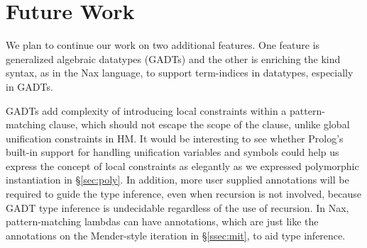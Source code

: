 \documentclass[runningheads,a4paper]{llncs}
\begin{document}
\section{Future Work}\label{sec:futwork}
We plan to continue our work on two additional features.
One feature is generalized algebraic datatypes (GADTs)
and the other is enriching the kind syntax, as in the
Nax language, to support term-indices in datatypes,
especially in GADTs.

GADTs add complexity of introducing local constraints
within a pattern-matching clause, which should not escape
the scope of the clause, unlike global unification constraints in HM.
It would be interesting to see whether Prolog's built-in support for
handling unification variables and symbols could help us express
the concept of local constraints as elegantly as we expressed
polymorphic instantiation in \S\ref{sec:poly}. In addition,
more user supplied annotations will be required to guide the type inference,
even when recursion is not involved, because GADT type inference is
undecidable \cite{DegtyarevV95} regardless of the use of recursion.
In Nax, pattern-matching lambdas can have annotations, which are
just like the annotations on the Mender-style iteration in \S\ref{ssec:mit},
to aid type inference.
\end{document}
